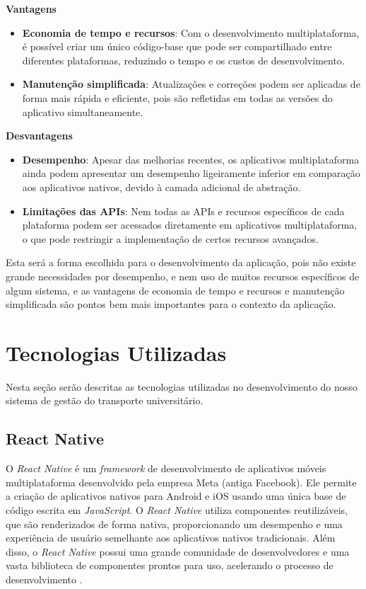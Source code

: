 \documentclass[
    12pt,                   %
    openright,              %
    oneside,                %
    a4paper,                %
    sumario=tradicional,    %
    english,                %
    brazil,                 %
    ]{abntex2}
\begin{document}
\textbf{Vantagens}
\begin{itemize}
  \item \textbf{Economia de tempo e recursos}: Com o desenvolvimento multiplataforma, é possível criar um único código-base que pode ser compartilhado entre diferentes plataformas, reduzindo o tempo e os custos de desenvolvimento.
  \item \textbf{Manutenção simplificada}: Atualizações e correções podem ser aplicadas de forma mais rápida e eficiente, pois são refletidas em todas as versões do aplicativo simultaneamente.
\end{itemize}

\textbf{Desvantagens}
\begin{itemize}
  \item \textbf{Desempenho}: Apesar das melhorias recentes, os aplicativos multiplataforma ainda podem apresentar um desempenho ligeiramente inferior em comparação aos aplicativos nativos, devido à camada adicional de abstração.
  \item \textbf{Limitações das APIs}: Nem todas as APIs e recursos específicos de cada plataforma podem ser acessados diretamente em aplicativos multiplataforma, o que pode restringir a implementação de certos recursos avançados.
\end{itemize}

Esta será a forma escolhida para o desenvolvimento da aplicação, pois não existe grande necessidades por desempenho, e nem uso de muitos recursos específicos de algum sistema, e as vantagens de economia de tempo e recursos e manutenção simplificada são pontos bem mais importantes para o contexto da aplicação.

\section{Tecnologias Utilizadas}
\label{sec:tecnologias-utilizadas}

Nesta seção serão descritas as tecnologias utilizadas no desenvolvimento do nosso sistema de gestão do transporte universitário.

\subsection{React Native}
\label{subsec:react-native}

O \textit{React Native} é um \textit{framework} de desenvolvimento de aplicativos móveis multiplataforma desenvolvido pela empresa Meta (antiga Facebook). Ele permite a criação de aplicativos nativos para Android e iOS usando uma única base de código escrita em \textit{JavaScript}. O \textit{React Native} utiliza componentes reutilizáveis, que são renderizados de forma nativa, proporcionando um desempenho e uma experiência de usuário semelhante aos aplicativos nativos tradicionais. Além disso, o \textit{React Native} possui uma grande comunidade de desenvolvedores e uma vasta biblioteca de componentes prontos para uso, acelerando o processo de desenvolvimento \cite{alura-react-native}.
\end{document}
